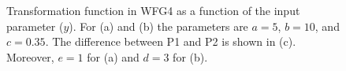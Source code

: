 \documentclass{llncs}
\begin{document}
\begin{figure}
\centering
{}
 \caption{Transformation function in WFG4 as a function of the input parameter ($y$). For (a) and (b) the parameters are $a=5$, $b=10$, and $c=0.35$. The difference between P1 and P2 is shown in (c). Moreover, $e=1$ for (a) and $d=3$ for (b).}
 \label{fig:transformation_function}
\end{figure}
\end{document}
